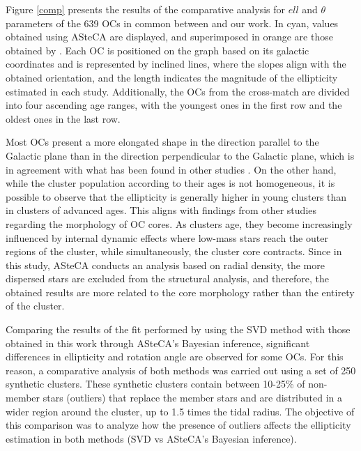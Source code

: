 \documentclass[baaa]{baaa}
\begin{document}
Figure \ref{comp} presents the results of the comparative analysis for $ell$ and $\theta$ parameters of the 639 OCs in common between \cite{2021A&A...656A..49H} and our work. In cyan, values obtained using ASteCA are displayed, and superimposed in orange are those obtained by \cite{2021A&A...656A..49H}. Each OC is positioned on the graph based on its galactic coordinates and is represented by inclined lines, where the slopes align with the obtained orientation, and the length indicates the magnitude of the ellipticity estimated in each study. Additionally, the OCs from the cross-match are divided into four ascending age ranges, with the youngest ones in the first row and the oldest ones in the last row.

Most OCs present a more elongated shape in the direction parallel to the Galactic plane than in the direction perpendicular to the Galactic plane, which is in agreement with what has been found in other studies \citep{2001A&A...377..462B, 2017AJ....153...57Z, 2021ApJ...912..162P}.
On the other hand, while the cluster population according to their ages is not homogeneous, it is possible to observe that the ellipticity is generally higher in young clusters than in clusters of advanced ages. This aligns with findings from other studies \citep{2004AJ....128.2306C, 2017AJ....153...57Z} regarding the morphology of OC cores. As clusters age, they become increasingly influenced by internal dynamic effects where low-mass stars reach the outer regions of the cluster, while simultaneously, the cluster core contracts. Since in this study, ASteCA conducts an analysis based on radial density, the more dispersed stars are excluded from the structural analysis, and therefore, the obtained results are more related to the core morphology rather than the entirety of the cluster.


Comparing the results of the fit performed by \cite{2021A&A...656A..49H} using the SVD method with those obtained in this work through ASteCA's Bayesian inference, significant differences in ellipticity and rotation angle are observed for some OCs. For this reason, a comparative analysis of both methods was carried out using a set of 250 synthetic clusters. These synthetic clusters contain between 10-25\% of non-member stars (outliers) that replace the member stars and are distributed in a wider region around the cluster, up to 1.5 times the tidal radius. The objective of this comparison was to analyze how the presence of outliers affects the ellipticity estimation in both methods (SVD vs ASteCA's Bayesian inference).
\end{document}

